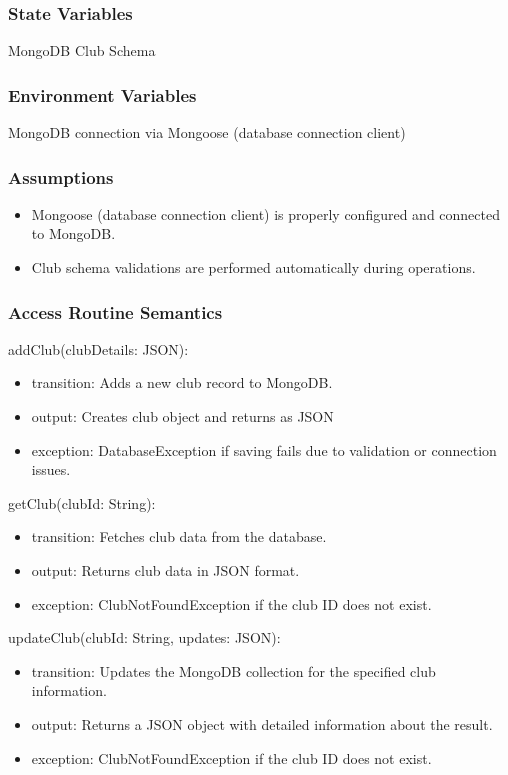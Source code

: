 \documentclass[12pt, titlepage]{article}
\begin{document}
\subsubsection{State Variables}
MongoDB Club Schema

\subsubsection{Environment Variables}
MongoDB connection via Mongoose (database connection client)

\subsubsection{Assumptions}
\begin{itemize}
  \item Mongoose (database connection client) is properly configured and connected to MongoDB.
  \item Club schema validations are performed automatically during operations.
\end{itemize}

\subsubsection{Access Routine Semantics}

\noindent addClub(clubDetails: JSON):
\begin{itemize}
  \item transition: Adds a new club record to MongoDB.
  \item output: Creates club object and returns as JSON
  \item exception: DatabaseException if saving fails due to validation or connection issues.
\end{itemize}

\noindent getClub(clubId: String):
\begin{itemize}
  \item transition: Fetches club data from the database.
  \item output: Returns club data in JSON format.
  \item exception: ClubNotFoundException if the club ID does not exist.
\end{itemize}

\noindent updateClub(clubId: String, updates: JSON):
\begin{itemize}
  \item transition: Updates the MongoDB collection for the specified club information.
  \item output: Returns a JSON object with detailed information about the result.
  \item exception: ClubNotFoundException if the club ID does not exist.
\end{itemize}
\end{document}
